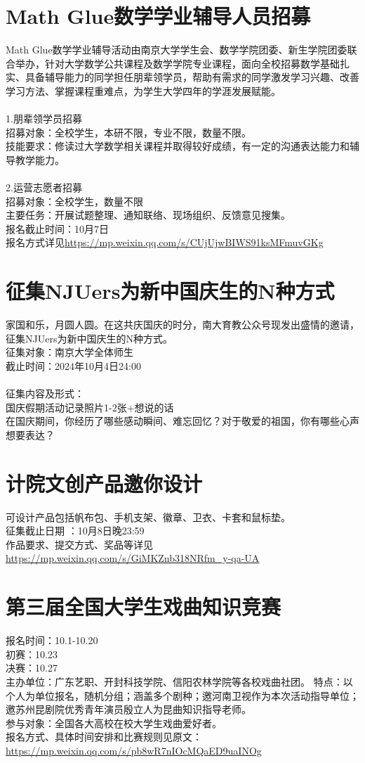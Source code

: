 \documentclass[letterpaper, 12pt]{article}
\begin{document}
\begin{multicols}{2}
\section{Math Glue数学学业辅导人员招募}
Math Glue数学学业辅导活动由南京大学学生会、数学学院团委、新生学院团委联合举办，针对大学数学公共课程及数学学院专业课程，面向全校招募数学基础扎实、具备辅导能力的同学担任朋辈领学员，帮助有需求的同学激发学习兴趣、改善学习方法、掌握课程重难点，为学生大学四年的学涯发展赋能。\\\\
1.朋辈领学员招募\\
招募对象：全校学生，本研不限，专业不限，数量不限。\\
技能要求：修读过大学数学相关课程并取得较好成绩，有一定的沟通表达能力和辅导教学能力。\\\\
2.运营志愿者招募\\
招募对象：全校学生，数量不限\\
主要任务：开展试题整理、通知联络、现场组织、反馈意见搜集。\\
报名截止时间：10月7日\\
报名方式详见\url{https://mp.weixin.qq.com/s/CUjUjwBIWS91ksMFmuvGKg}
\section{征集NJUers为新中国庆生的N种方式}
家国和乐，月圆人圆。在这共庆国庆的时分，南大育教公众号现发出盛情的邀请，征集NJUers为新中国庆生的N种方式。\\
征集对象：南京大学全体师生\\
截止时间：2024年10月4日24:00\\\\
征集内容及形式：\\
国庆假期活动记录照片1-2张+想说的话\\
在国庆期间，你经历了哪些感动瞬间、难忘回忆？对于敬爱的祖国，你有哪些心声想要表达？
\section{计院文创产品邀你设计}
可设计产品包括帆布包、手机支架、徽章、卫衣、卡套和鼠标垫。\\
征集截止日期 ：10月8日晚23:59\\
作品要求、提交方式、奖品等详见\url{https://mp.weixin.qq.com/s/GiMKZnb318NRfm_y-qa-UA}

\section{第三届全国大学生戏曲知识竞赛}
报名时间：10.1-10.20\\
初赛：10.23\\
决赛：10.27\\
主办单位：广东艺职、开封科技学院、信阳农林学院等各校戏曲社团。
特点：以个人为单位报名，随机分组；涵盖多个剧种；邀河南卫视作为本次活动指导单位；邀苏州昆剧院优秀青年演员殷立人为昆曲知识指导老师。\\
参与对象：全国各大高校在校大学生戏曲爱好者。\\
报名方式、具体时间安排和比赛规则见原文：\url{https://mp.weixin.qq.com/s/pb8wR7nIOcMQaED9uaINOg}

\end{multicols}
\end{document}
